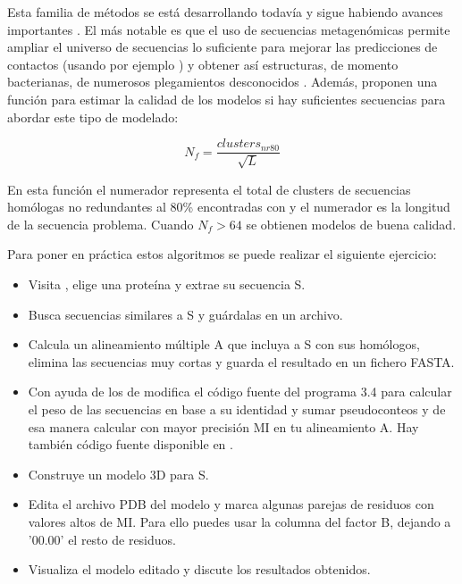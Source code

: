 Esta familia de m\'{e}todos  se est\'{a} desarrollando todav\'{i}a y sigue habiendo avances importantes \citep{Buchan2017}.
El m\'{a}s notable es que el uso de secuencias metagen\'{o}micas permite ampliar el universo de secuencias lo suficiente 
para mejorar las predicciones de contactos (usando por ejemplo ) 
y obtener as\'{i} estructuras, de momento bacterianas, de numerosos plegamientos desconocidos \citep{Ovchinnikov2017}. 
Adem\'{a}s, \citet{Ovchinnikov2017} proponen una funci\'{o}n para estimar la calidad de los modelos si hay suficientes secuencias para abordar
este tipo de modelado:

\begin{equation}
N_{f} = \frac{clusters_{nr80}}{\sqrt L} 
\end{equation} 

En esta funci\'{o}n el numerador representa el total de clusters de secuencias hom\'{o}logas no redundantes al 80\% 
encontradas con  y el numerador es la longitud de la secuencia problema. 
Cuando $N_{f} > 64$ se obtienen modelos de buena calidad. 
 
Para poner en pr\'{a}ctica estos algoritmos se puede realizar el siguiente ejercicio:

\begin{itemize}

\item Visita , elige una prote\'{i}na y extrae su secuencia S.

\item Busca secuencias similares a S y gu\'{a}rdalas en un archivo.

\item Calcula un alineamiento m\'{u}ltiple A que incluya a S con sus hom\'{o}logos, elimina las secuencias muy cortas y 
guarda el resultado en un fichero FASTA.

\item Con ayuda de los 
 de \cite{Marks2011}
modifica el c\'{o}digo fuente del programa 3.4 para calcular el peso de las secuencias en base a su identidad
y sumar pseudoconteos y de esa manera calcular con mayor precisi\'{o}n MI en tu alineamiento A.
Hay tambi\'{e}n c\'{o}digo fuente disponible en 
.

\item Construye un modelo 3D para S.

\item Edita el archivo PDB del modelo y marca algunas parejas de residuos con valores altos de MI. Para ello puedes usar la columna del factor B,
dejando a '00.00' el resto de residuos. 

\item Visualiza el modelo editado y discute los resultados obtenidos.

\end{itemize}

